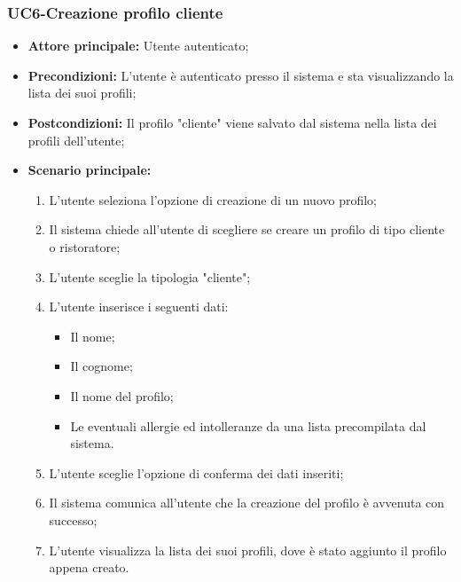 \subsubsection{UC6-Creazione profilo cliente}
\begin{itemize}
    \item \textbf{Attore principale:} Utente autenticato;
    \item \textbf{Precondizioni:} L'utente è autenticato presso il sistema e sta visualizzando la lista dei suoi profili;
    \item \textbf{Postcondizioni:} Il profilo "cliente" viene salvato dal sistema nella lista dei profili dell'utente;
    \item \textbf{Scenario principale:}
    \begin{enumerate}
        \item L'utente seleziona l'opzione di creazione di un nuovo profilo;
        \item Il sistema chiede all'utente di scegliere se creare un profilo di tipo cliente o ristoratore;
        \item L'utente sceglie la tipologia "cliente";
        \item L'utente inserisce i seguenti dati:
        \begin{itemize}
            \item Il nome;
            \item Il cognome;
            \item Il nome del profilo;
            \item Le eventuali allergie ed intolleranze da una lista precompilata dal sistema.
        \end{itemize}
        \item L'utente sceglie l'opzione di conferma dei dati inseriti;
        \item Il sistema comunica all'utente che la creazione del profilo è avvenuta con successo;
        \item L'utente visualizza la lista dei suoi profili, dove è stato aggiunto il profilo appena creato.
    \end{enumerate}
\end{itemize}

